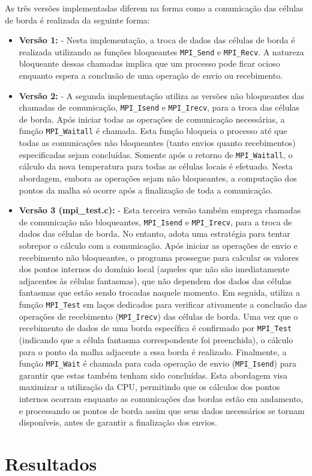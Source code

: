 \documentclass[a4paper, 12pt]{article}
\begin{document}
	As três versões implementadas diferem na forma como a comunicação das células de borda é realizada da seguinte forma:
	
	\begin{itemize}
		\item \textbf{Versão 1:} - Nesta implementação, a troca de dados das células de borda é realizada utilizando as funções bloqueantes \texttt{MPI\_Send} e \texttt{MPI\_Recv}. A natureza bloqueante dessas chamadas implica que um processo pode ficar ocioso enquanto espera a conclusão de uma operação de envio ou recebimento.
		
		\item \textbf{Versão 2:} - A segunda implementação utiliza as versões não bloqueantes das chamadas de comunicação, \texttt{MPI\_Isend} e \texttt{MPI\_Irecv}, para a troca das células de borda. Após iniciar todas as operações de comunicação necessárias, a função \texttt{MPI\_Waitall} é chamada. Esta função bloqueia o processo até que todas as comunicações não bloqueantes (tanto envios quanto recebimentos) especificadas sejam concluídas. Somente após o retorno de \texttt{MPI\_Waitall}, o cálculo da nova temperatura para todas as células locais é efetuado. Nesta abordagem, embora as operações sejam não bloqueantes, a computação dos pontos da malha só ocorre após a finalização de toda a comunicação.
		
		\item \textbf{Versão 3 (mpi\_test.c):} - Esta terceira versão também emprega chamadas de comunicação não bloqueantes, \texttt{MPI\_Isend} e \texttt{MPI\_Irecv}, para a troca de dados das células de borda. No entanto, adota uma estratégia para tentar sobrepor o cálculo com a comunicação. Após iniciar as operações de envio e recebimento não bloqueantes, o programa prossegue para calcular os valores dos pontos internos do domínio local (aqueles que não são imediatamente adjacentes às células fantasmas), que não dependem dos dados das células fantasmas que estão sendo trocadas naquele momento. Em seguida, utiliza a função \texttt{MPI\_Test} em laços dedicados para verificar ativamente a conclusão das operações de recebimento (\texttt{MPI\_Irecv}) das células de borda. Uma vez que o recebimento de dados de uma borda específica é confirmado por \texttt{MPI\_Test} (indicando que a célula fantasma correspondente foi preenchida), o cálculo para o ponto da malha adjacente a essa borda é realizado. Finalmente, a função \texttt{MPI\_Wait} é chamada para cada operação de envio (\texttt{MPI\_Isend}) para garantir que estas também tenham sido concluídas. Esta abordagem visa maximizar a utilização da CPU, permitindo que os cálculos dos pontos internos ocorram enquanto as comunicações das bordas estão em andamento, e processando os pontos de borda assim que seus dados necessários se tornam disponíveis, antes de garantir a finalização dos envios.
		
	\end{itemize}
	
	\section{Resultados}
	
\end{document}
